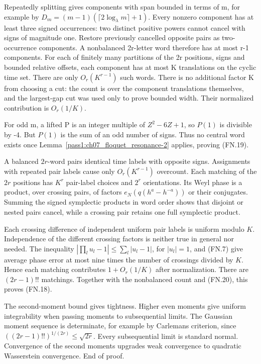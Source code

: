 Repeatedly splitting gives components with span bounded in terms of m, for example by \(D_m=(m-1)(\lceil2\log_\lambda m\rceil+1)\). Every nonzero component has at least three signed occurrences: two distinct positive powers cannot cancel with signs of magnitude one. Restore previously cancelled opposite pairs as two-occurrence components. A nonbalanced 2r-letter word therefore has at most r-1 components. For each of finitely many partitions of the 2r positions, signs and bounded relative offsets, each component has at most K translations on the cyclic time set. There are only \(O_r(K^{r-1})\) such words. There is no additional factor K from choosing a cut: the count is over the component translations themselves, and the largest-gap cut was used only to prove bounded width. Their normalized contribution is \(O_r(1/K)\).

For odd m, a lifted P is an integer multiple of \(Z^2-6Z+1\), so \(P(1)\) is divisible by -4. But \(P(1)\) is the sum of an odd number of signs. Thus no central word exists once Lemma~\ref{pass1:ch07_floquet_resonance-2} applies, proving (FN.19).

A balanced \(2r\)-word pairs identical time labels with opposite signs. Assignments with repeated pair labels cause only \(O_r(K^{r-1})\) overcount. Each matching of the \(2r\) positions has \(K^r\) pair-label choices and \(2^r\) orientations. Its Weyl phase is a product, over crossing pairs, of factors \(e_N(q(h^a-h^{-a}))\) or their conjugates. Summing the signed symplectic products in word order shows that disjoint or nested pairs cancel, while a crossing pair retains one full symplectic product.

Each crossing difference of independent uniform pair labels is uniform modulo \(K\). Independence of the different crossing factors is neither true in general nor needed. The inequality \(|\prod_l u_l-1|\leq\sum_l|u_l-1|\), for \(|u_l|=1\), and (FN.7) give average phase error at most nine times the number of crossings divided by \(K\). Hence each matching contributes \(1+O_r(1/K)\) after normalization. There are \((2r-1)!!\) matchings. Together with the nonbalanced count and (FN.20), this proves (FN.18).

The second-moment bound gives tightness. Higher even moments give uniform integrability when passing moments to subsequential limits. The Gaussian moment sequence is determinate, for example by Carleman\textquotesingle s criterion, since \(((2r-1)!!)^{1/(2r)}\leq\sqrt{2r}\). Every subsequential limit is standard normal. Convergence of the second moments upgrades weak convergence to quadratic Wasserstein convergence. End of proof.

